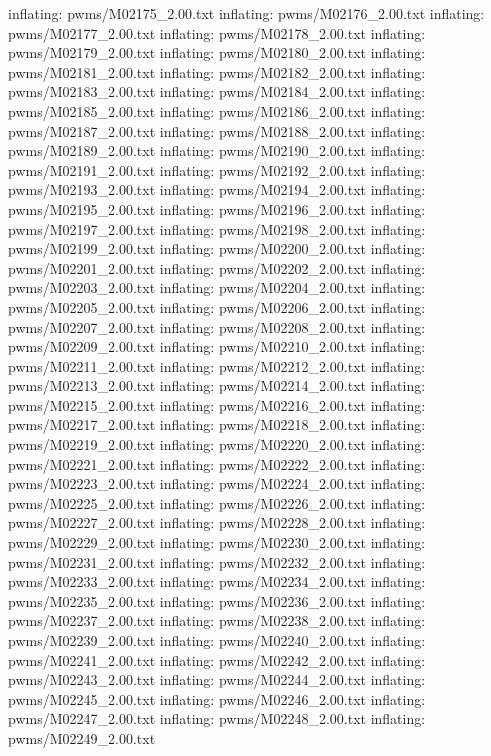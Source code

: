\documentclass[letterpaper,10pt,english]{sphinxmanual}
\begin{document}
{\begin{sphinxVerbatim}[commandchars=\\\{\}]
  inflating: pwms/M02175\_2.00.txt
  inflating: pwms/M02176\_2.00.txt
  inflating: pwms/M02177\_2.00.txt
  inflating: pwms/M02178\_2.00.txt
  inflating: pwms/M02179\_2.00.txt
  inflating: pwms/M02180\_2.00.txt
  inflating: pwms/M02181\_2.00.txt
  inflating: pwms/M02182\_2.00.txt
  inflating: pwms/M02183\_2.00.txt
  inflating: pwms/M02184\_2.00.txt
  inflating: pwms/M02185\_2.00.txt
  inflating: pwms/M02186\_2.00.txt
  inflating: pwms/M02187\_2.00.txt
  inflating: pwms/M02188\_2.00.txt
  inflating: pwms/M02189\_2.00.txt
  inflating: pwms/M02190\_2.00.txt
  inflating: pwms/M02191\_2.00.txt
  inflating: pwms/M02192\_2.00.txt
  inflating: pwms/M02193\_2.00.txt
  inflating: pwms/M02194\_2.00.txt
  inflating: pwms/M02195\_2.00.txt
  inflating: pwms/M02196\_2.00.txt
  inflating: pwms/M02197\_2.00.txt
  inflating: pwms/M02198\_2.00.txt
  inflating: pwms/M02199\_2.00.txt
  inflating: pwms/M02200\_2.00.txt
  inflating: pwms/M02201\_2.00.txt
  inflating: pwms/M02202\_2.00.txt
  inflating: pwms/M02203\_2.00.txt
  inflating: pwms/M02204\_2.00.txt
  inflating: pwms/M02205\_2.00.txt
  inflating: pwms/M02206\_2.00.txt
  inflating: pwms/M02207\_2.00.txt
  inflating: pwms/M02208\_2.00.txt
  inflating: pwms/M02209\_2.00.txt
  inflating: pwms/M02210\_2.00.txt
  inflating: pwms/M02211\_2.00.txt
  inflating: pwms/M02212\_2.00.txt
  inflating: pwms/M02213\_2.00.txt
  inflating: pwms/M02214\_2.00.txt
  inflating: pwms/M02215\_2.00.txt
  inflating: pwms/M02216\_2.00.txt
  inflating: pwms/M02217\_2.00.txt
  inflating: pwms/M02218\_2.00.txt
  inflating: pwms/M02219\_2.00.txt
  inflating: pwms/M02220\_2.00.txt
  inflating: pwms/M02221\_2.00.txt
  inflating: pwms/M02222\_2.00.txt
  inflating: pwms/M02223\_2.00.txt
  inflating: pwms/M02224\_2.00.txt
  inflating: pwms/M02225\_2.00.txt
  inflating: pwms/M02226\_2.00.txt
  inflating: pwms/M02227\_2.00.txt
  inflating: pwms/M02228\_2.00.txt
  inflating: pwms/M02229\_2.00.txt
  inflating: pwms/M02230\_2.00.txt
  inflating: pwms/M02231\_2.00.txt
  inflating: pwms/M02232\_2.00.txt
  inflating: pwms/M02233\_2.00.txt
  inflating: pwms/M02234\_2.00.txt
  inflating: pwms/M02235\_2.00.txt
  inflating: pwms/M02236\_2.00.txt
  inflating: pwms/M02237\_2.00.txt
  inflating: pwms/M02238\_2.00.txt
  inflating: pwms/M02239\_2.00.txt
  inflating: pwms/M02240\_2.00.txt
  inflating: pwms/M02241\_2.00.txt
  inflating: pwms/M02242\_2.00.txt
  inflating: pwms/M02243\_2.00.txt
  inflating: pwms/M02244\_2.00.txt
  inflating: pwms/M02245\_2.00.txt
  inflating: pwms/M02246\_2.00.txt
  inflating: pwms/M02247\_2.00.txt
  inflating: pwms/M02248\_2.00.txt
  inflating: pwms/M02249\_2.00.txt

\end{sphinxVerbatim}}
\end{document}
